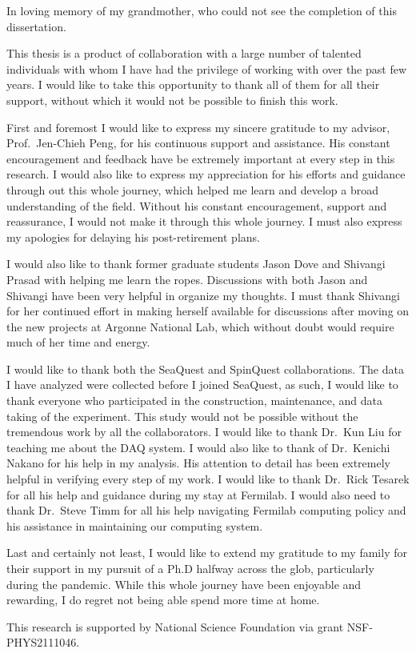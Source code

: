 \documentclass[../main.tex]{subfiles}
\begin{document}
\begin{dedication}
	In loving memory of my grandmother, who could not see the completion of this dissertation.
\end{dedication}

\begin{acknowledgments}
	This thesis is a product of collaboration with a large number of talented
	individuals with whom I have had the privilege of working with over the past
	few years. I would like to take this opportunity to thank all of them for all
	their support, without which it would not be possible to finish this work.

	First and foremost I would like to express my sincere gratitude to my advisor, Prof.~Jen-Chieh Peng, for
	his continuous support and assistance. His constant encouragement and feedback
	have be extremely important at every step in this research.
	I would also like to express my	appreciation for his efforts and guidance
	through out this whole journey, which helped me learn and develop a broad
	understanding of the field.
	Without his constant encouragement, support
	and reassurance, I would not  make it through this whole journey.
	I must also express my apologies for delaying his post-retirement plans.

	I would also like to thank former graduate students Jason Dove and Shivangi
	Prasad with helping me learn the ropes. Discussions with both Jason and
	Shivangi have been very helpful in organize my thoughts.
	I must thank Shivangi for her continued effort in making herself available for
	discussions after moving on the new projects at Argonne National Lab, which
	without doubt would require much of her time and energy.

	I would like to thank both the SeaQuest and SpinQuest collaborations.
	The data I have analyzed were collected before I joined SeaQuest, as such,
	I would like to thank everyone who participated in the construction, maintenance,
	and data taking of the experiment.
	This study would not be possible without the tremendous work by all the collaborators.
	I would like to thank Dr.~Kun Liu for teaching me about the DAQ system.
	I would also like to thank of Dr.~Kenichi Nakano for his help in my analysis.
	His attention to detail has been extremely helpful in verifying every step
	of my work.
	I would like to thank Dr.~Rick Tesarek for all his help and guidance during my
	stay at Fermilab.
	I would also need to thank Dr.~Steve Timm for all his help navigating Fermilab
	computing policy and his assistance in maintaining our computing system.

	Last and certainly not least, I would like to extend my gratitude to my family
	for their support in my pursuit of a Ph.D halfway across the glob, particularly
	during the pandemic. While this whole journey have been enjoyable and rewarding,
	I do regret not being able spend more time at home.

	This research is supported by National Science Foundation via grant NSF-PHYS2111046.

\end{acknowledgments}
\end{document}
